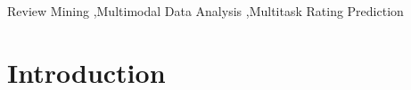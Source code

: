 \documentclass[preprint,12pt]{elsarticle}
\begin{document}
\begin{frontmatter}
%
%
%
%
%
%
%
%

\begin{keyword}
Review Mining \sep Multimodal Data Analysis \sep Multitask Rating Prediction


\end{keyword}

\end{frontmatter}



\section{Introduction}
\end{document}
